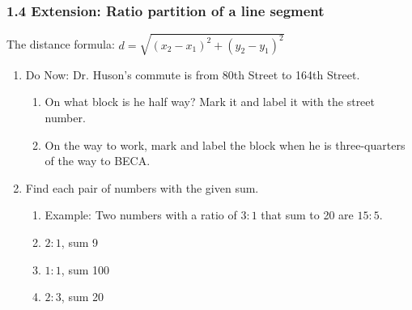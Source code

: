 

\fancyhead[LE]{\thepage}



\subsubsection*{1.4 Extension: Ratio partition of a line segment}
The distance formula: $\displaystyle d=\sqrt{(x_2-x_1)^2+(y_2-y_1)^2}$
\begin{enumerate}
\item Do Now: Dr. Huson's commute is from 80th Street to 164th Street. 
\begin{enumerate}
    \item On what block is he half way? Mark it and label it with the street number.
    \item On the way to work, mark and label the block when he is three-quarters of the way to BECA.
\end{enumerate}
    \vspace{5cm}


\item Find each pair of numbers with the given sum.
\begin{enumerate}
    \item Example: Two numbers with a ratio of $3:1$ that sum to 20 are $15:5$.
    \item $2:1$, sum 9 \vspace{1cm}
    \item $1:1$, sum 100 \vspace{1cm}
    \item $2:3$, sum 20 \vspace{1cm}
\end{enumerate}


\end{enumerate}
